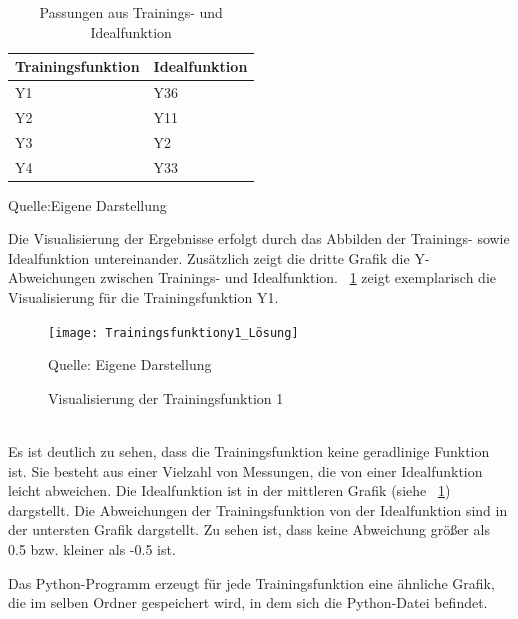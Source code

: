 \documentclass[
    a4paper, 								%
    oneside, 								%
    11pt, 									%
    listof=totoc, 					%
    bibliography=totoc, 		%
    final, 									%
    numbers=noenddot
]{scrreprt}
\newcommand{\abbildung}[1]{\figurename\ \ref{#1}}
\begin{document}
\begin{table}[!h]
\centering
\caption{Passungen aus Trainings- und Idealfunktion}
\vspace{6pt}
\begin{tabularx}{0.5\textwidth}{|l|X|}
\hline
\textbf{Trainingsfunktion} & \textbf{Idealfunktion}\\
\hline
Y1 & Y36\\
\hline
Y2 & Y11\\
\hline
Y3 & Y2\\
\hline
Y4 & Y33\\
\hline
\end{tabularx}
\vspace{6pt}

Quelle:Eigene Darstellung
\label{tab:Passungen}
\end{table}
Die Visualisierung der Ergebnisse erfolgt durch das Abbilden der Trainings- sowie Idealfunktion untereinander. Zusätzlich zeigt die dritte Grafik die Y-Abweichungen zwischen Trainings- und Idealfunktion. \abbildung{fig:Train1} zeigt exemplarisch die Visualisierung für die Trainingsfunktion Y1.
\begin{figure}[!h]
	\caption{Visualisierung der Trainingsfunktion 1}
	\vspace{6pt}
	\centering
	\texttt{[image: Trainingsfunktiony1\_Lösung]}
	\vspace{6pt}
	
	Quelle: Eigene Darstellung
	\label{fig:Train1}
\end{figure}
\\
Es ist deutlich zu sehen, dass die Trainingsfunktion keine geradlinige Funktion ist. Sie besteht aus einer Vielzahl von Messungen, die von einer Idealfunktion leicht abweichen. Die Idealfunktion ist in der mittleren Grafik (siehe \abbildung{fig:Train1}) dargstellt. Die Abweichungen der Trainingsfunktion von der Idealfunktion sind in der untersten Grafik dargstellt. Zu sehen ist, dass keine Abweichung größer als 0.5 bzw. kleiner als -0.5 ist.

Das Python-Programm erzeugt für jede Trainingsfunktion eine ähnliche Grafik, die im selben Ordner gespeichert wird, in dem sich die Python-Datei befindet. 
\end{document}
